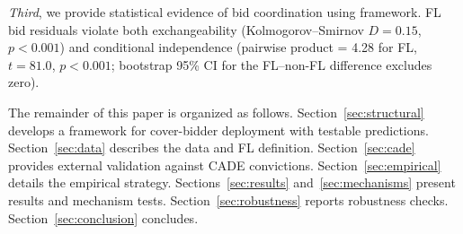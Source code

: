 \emph{Third}, we provide statistical evidence of bid coordination using
\cites{bajari2003deciding} framework. FL bid residuals violate both
exchangeability (Kolmogorov--Smirnov $D = 0.15$, $p < 0.001$) and
conditional independence (pairwise product = 4.28 for FL, $t = 81.0$, %
$p < 0.001$; bootstrap 95\% CI for the FL--non-FL difference excludes
zero).

The remainder of this paper is organized as follows.
Section~\ref{sec:structural} develops a framework for cover-bidder %
deployment with testable predictions. Section~\ref{sec:data} describes
the data and FL definition. Section~\ref{sec:cade} provides external
validation against CADE convictions. Section~\ref{sec:empirical} details
the empirical strategy. Sections~\ref{sec:results}
and~\ref{sec:mechanisms} present results and mechanism tests.
Section~\ref{sec:robustness} reports robustness checks.
Section~\ref{sec:conclusion} concludes.
